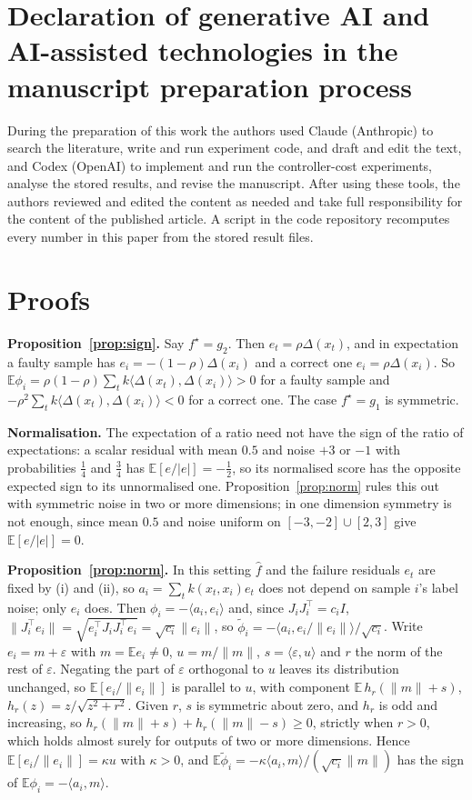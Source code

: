 \documentclass[preprint,12pt]{elsarticle}
\newcommand{\E}{\mathbb{E}}
\begin{document}
\section*{Declaration of generative AI and AI-assisted technologies in the manuscript preparation process}
During the preparation of this work the authors used Claude (Anthropic) to search the literature, write and run experiment code, and draft and edit the text, and Codex (OpenAI) to implement and run the controller-cost experiments, analyse the stored results, and revise the manuscript. After using these tools, the authors reviewed and edited the content as needed and take full responsibility for the content of the published article. A script in the code repository recomputes every number in this paper from the stored result files.




\appendix

\section{Proofs}\label{app:proofs}

\textbf{Proposition~\ref{prop:sign}.} Say $f^\star=g_2$. Then $e_t=\rho\Delta(x_t)$, and in expectation a faulty sample has $e_i=-(1-\rho)\Delta(x_i)$ and a correct one $e_i=\rho\Delta(x_i)$. So $\E\phi_i=\rho(1-\rho)\sum_t k\langle\Delta(x_t),\Delta(x_i)\rangle>0$ for a faulty sample and $-\rho^2\sum_t k\langle\Delta(x_t),\Delta(x_i)\rangle<0$ for a correct one. The case $f^\star=g_1$ is symmetric.

\textbf{Normalisation.} The expectation of a ratio need not have the sign of the ratio of expectations: a scalar residual with mean $0.5$ and noise $+3$ or $-1$ with probabilities $\frac14$ and $\frac34$ has $\E[e/|e|]=-\frac12$, so its normalised score has the opposite expected sign to its unnormalised one. Proposition~\ref{prop:norm} rules this out with symmetric noise in two or more dimensions; in one dimension symmetry is not enough, since mean $0.5$ and noise uniform on $[-3,-2]\cup[2,3]$ give $\E[e/|e|]=0$.

\textbf{Proposition~\ref{prop:norm}.} In this setting $\hat f$ and the failure residuals $e_t$ are fixed by (i) and (ii), so $a_i=\sum_tk(x_t,x_i)e_t$ does not depend on sample $i$'s label noise; only $e_i$ does. Then $\phi_i=-\langle a_i,e_i\rangle$ and, since $J_iJ_i^\top=c_iI$, $\|J_i^\top e_i\|=\sqrt{e_i^\top J_iJ_i^\top e_i}=\sqrt{c_i}\|e_i\|$, so $\tilde\phi_i=-\langle a_i,e_i/\|e_i\|\rangle/\sqrt{c_i}$. Write $e_i=m+\varepsilon$ with $m=\E e_i\ne0$, $u=m/\|m\|$, $s=\langle\varepsilon,u\rangle$ and $r$ the norm of the rest of $\varepsilon$. Negating the part of $\varepsilon$ orthogonal to $u$ leaves its distribution unchanged, so $\E[e_i/\|e_i\|]$ is parallel to $u$, with component $\E\,h_r(\|m\|+s)$, $h_r(z)=z/\sqrt{z^2+r^2}$. Given $r$, $s$ is symmetric about zero, and $h_r$ is odd and increasing, so $h_r(\|m\|+s)+h_r(\|m\|-s)\ge0$, strictly when $r>0$, which holds almost surely for outputs of two or more dimensions. Hence $\E[e_i/\|e_i\|]=\kappa u$ with $\kappa>0$, and $\E\tilde\phi_i=-\kappa\langle a_i,m\rangle/(\sqrt{c_i}\|m\|)$ has the sign of $\E\phi_i=-\langle a_i,m\rangle$.
\end{document}
